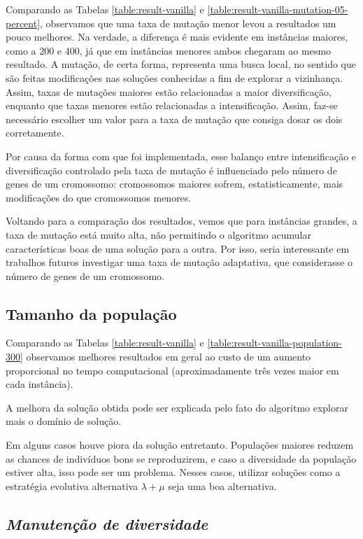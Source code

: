 \documentclass[11pt]{article}
\begin{document}
Comparando as Tabelas \ref{table:result-vanilla} e \ref{table:result-vanilla-mutation-05-percent}, observamos que uma taxa de mutação menor levou a resultados um pouco melhores. Na verdade, a diferença é mais evidente em instâncias maiores, como a 200 e 400, já que em instâncias menores ambos chegaram ao mesmo resultado. A mutação, de certa forma, representa uma busca local, no sentido que são feitas modificações nas soluções conhecidas a fim de explorar a vizinhança. Assim, taxas de mutações maiores estão relacionadas a maior diversificação, enquanto que taxas menores estão relacionadas a intensificação. Assim, faz-se necessário escolher um valor para a taxa de mutação que consiga dosar os dois corretamente.

Por causa da forma com que foi implementada, esse balanço entre intensificação e diversificação controlado pela taxa de mutação é influenciado pelo número de genes de um cromossomo: cromossomos maiores sofrem, estatisticamente, mais modificações do que cromossomos menores.

Voltando para a comparação dos resultados, vemos que para instâncias grandes, a taxa de mutação está muito alta, não permitindo o algoritmo acumular características boas de uma solução para a outra. Por isso, seria interessante em trabalhos futuros investigar uma taxa de mutação adaptativa, que considerasse o número de genes de um cromossomo.

\subsection{Tamanho da população}

Comparando as Tabelas \ref{table:result-vanilla} e \ref{table:result-vanilla-population-300} observamos melhores resultados em geral ao custo de um aumento proporcional no tempo computacional (aproximadamente três vezes maior em cada instância).

A melhora da solução obtida pode ser explicada pelo fato do algoritmo explorar mais o domínio de solução.

Em alguns casos houve piora da solução entretanto. Populações maiores reduzem as chances de indivíduos bons se reproduzirem, e caso a diversidade da população estiver alta, isso pode ser um problema. Nesses casos, utilizar soluções como a estratégia evolutiva alternativa $\lambda + \mu$ seja uma boa alternativa.

\subsection{\textit{Manutenção de diversidade}}
\end{document}
